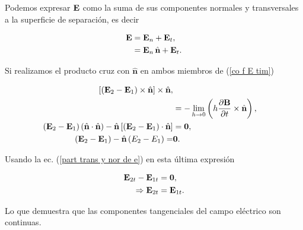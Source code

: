 Podemos expresar $\textbf{E}$ como la suma de sus componentes normales y transversales a la superficie de separación, es decir

\begin{align}
	\label{part trans y nor de e}
	\textbf{E} &= \textbf{E}_{n} + \textbf{E}_{t},\\
		 &= \textbf{E}_{n} \, \hat{\textbf{n}} + \textbf{E}_{t}.
\end{align}

Si realizamos el producto cruz con $\hat{\textbf{n}}$ en ambos miembros de (\ref{co f E tim})

\begin{align*}
\left[ \left( \E_{2} - \E_{1} \right) \times \hat{\textbf{n}} \right] \times \hat{\textbf{n}},\\
&= -\lim_{h\rightarrow 0} \left( h \diffp{\B}{t} \times \hat{\textbf{n}} \right),\\
\left( \E_{2} - \E_{1} \right) \left( \hat{\textbf{n}} \cdot \hat{\textbf{n}} \right) -\hat{\textbf{n}} \left[ \left( \E_{2} - \E_{1} \right) \cdot  \hat{\textbf{n}} \right]&= \textbf{0},\\
\left( \E_{2} - \E_{1} \right) - \hat{\textbf{n}} \left( E_{2} - E_{1} \right) =& \textbf{0}.
\end{align*}

Usando la ec. (\ref{part trans y nor de e}) en esta última expresión

\begin{align}
\textbf{E}_{2t} - \textbf{E}_{1t} &= \textbf{0},\\
\Rightarrow\textbf{E}_{2t} &= \textbf{E}_{1t}.
\end{align}

Lo que demuestra que las componentes tangenciales del campo eléctrico son continuas.



